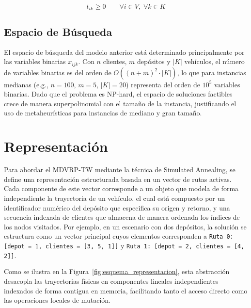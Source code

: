 \documentclass[letter, 10pt, dvipdfmx]{article}
\begin{document}
\begin{equation}
  t_{ik} \geq 0 \qquad \forall i \in V,\; \forall k \in K
\end{equation}

\subsection{Espacio de Búsqueda}

El espacio de búsqueda del modelo anterior está determinado principalmente por las variables binarias $x_{ijk}$. Con $n$ clientes, $m$ depósitos y $|K|$ vehículos, el número de variables binarias es del orden de $O((n+m)^2 \cdot |K|)$, lo que para instancias medianas (e.g., $n = 100$, $m = 5$, $|K| = 20$) representa del orden de $10^5$ variables binarias. Dado que el problema es NP-hard, el espacio de soluciones factibles crece de manera superpolinomial con el tamaño de la instancia, justificando el uso de metaheurísticas para instancias de mediano y gran tamaño.

\section{Representación}
Para abordar el MDVRP-TW mediante la técnica de Simulated Annealing, se define una
representación estructurada basada en un vector de rutas activas. Cada componente de este vector corresponde
a un objeto que modela de forma independiente la trayectoria de un vehículo, el cual está compuesto por un
identificador numérico del depósito que especifica su origen y retorno, y una secuencia indexada de clientes
que almacena de manera ordenada los índices de los nodos visitados. Por ejemplo, en
un escenario con dos depósitos, la solución se estructura como un vector principal cuyos elementos corresponden a
\texttt{Ruta 0: [depot = 1, clientes = [3, 5, 1]]} y \texttt{Ruta 1: [depot = 2, clientes = [4, 2]]}.

Como se ilustra en la Figura~\ref{fig:esquema_representacion}, esta abstracción desacopla las trayectorias físicas en componentes lineales independientes indexados de forma contigua en memoria, facilitando tanto el acceso directo como las operaciones locales de mutación.
\end{document}
